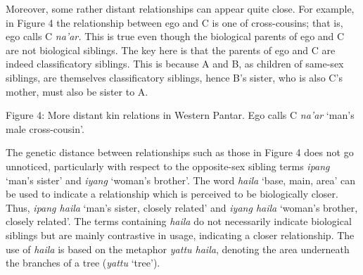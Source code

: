 Moreover, some rather distant relationships can appear quite close. For example, in Figure 4 the relationship between ego and C is one of cross-cousins; that is, ego calls C \textit{na{\textquoteright}ar.} This is true even though the biological parents of ego and C are not biological siblings. The key here is that the parents of ego and C are indeed classificatory siblings. This is because A and B, as children of same-sex siblings, are themselves classificatory siblings, hence B{\textquoteright}s sister, who is also C{\textquoteright}s mother, must also be sister to A. 

{\centering
Figure 4: More distant kin relations in Western Pantar. Ego calls C \textit{na{\textquoteright}ar} {\textquoteleft}man{\textquoteright}s male cross-cousin{\textquoteright}.
\par}

{%
 \par}

The genetic distance between relationships such as those in Figure 4 does not go unnoticed, particularly with respect to the opposite-sex sibling terms \textit{ipang }{\textquoteleft}man{\textquoteright}s sister{\textquoteright} and \textit{iyang} {\textquoteleft}woman{\textquoteright}s brother{\textquoteright}. The word \textit{haila} {\textquoteleft}base, main, area{\textquoteright} can be used to indicate a relationship which is perceived to be biologically closer. Thus, \textit{ipang haila} {\textquoteleft}man{\textquoteright}s sister, closely related{\textquoteright} and \textit{iyang haila} {\textquoteleft}woman{\textquoteright}s brother, closely related{\textquoteright}. The terms containing \textit{haila }do not necessarily indicate biological siblings but are mainly contrastive in usage, indicating a closer relationship. The use of \textit{haila }is based on the metaphor \textit{yattu haila}, denoting the area underneath the branches of a tree (\textit{yattu }{\textquoteleft}tree{\textquoteright}).

